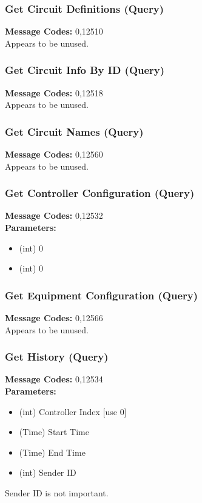 \documentclass[11pt]{article}
\begin{document}
\subsubsection{Get Circuit Definitions (Query)}
\label{msg:12510}
{\bf Message Codes: } 0,12510\\
Appears to be unused.

\subsubsection{Get Circuit Info By ID (Query)}
\label{msg:12518}
{\bf Message Codes: } 0,12518\\
Appears to be unused.

\subsubsection{Get Circuit Names (Query)}
\label{msg:12560}
{\bf Message Codes: } 0,12560\\
Appears to be unused.

\subsubsection{Get Controller Configuration (Query)}
\label{msg:12532}
{\bf Message Codes: } 0,12532\\
{\bf Parameters: }
\small
\begin{itemize}
\item (int) 0
\item (int) 0
\end{itemize}
\normalsize

\subsubsection{Get Equipment Configuration (Query)}
\label{msg:12566}
{\bf Message Codes: } 0,12566\\
Appears to be unused.

\subsubsection{Get History (Query)}
\label{msg:12534}
{\bf Message Codes: } 0,12534\\
{\bf Parameters: }
\small
\begin{itemize}
\item (int) Controller Index [use 0]
\item (Time) Start Time
\item (Time) End Time
\item (int) Sender ID
\end{itemize}
\normalsize
Sender ID is not important.
\end{document}
